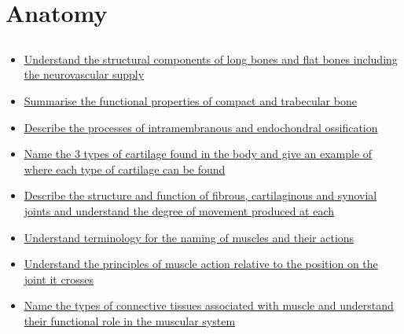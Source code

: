 \documentclass[10pt, a4paper]{article}
\begin{document}
\section{Anatomy}
\subsection{} \begin{itemize} \item \href{https://www.notion.so/2093c89b619848cf8682621738198af8}{Understand the structural components of long bones and flat bones including the neurovascular supply } \item \href{https://www.notion.so/e0f648d9053a4c209b498263d50acf19}{Summarise the functional properties of compact and trabecular bone} \item \href{https://www.notion.so/a5f60b7446204215b8c7420bae6ef034}{Describe the processes of intramembranous and endochondral ossification} \item \href{https://www.notion.so/ab94a8681cf54ed0810dae281dee9735}{Name the 3 types of cartilage found in the body and give an example of where each type of cartilage can be found} \item \href{https://www.notion.so/350df500b4214b198c356a60a27000bb}{Describe the structure and function of fibrous, cartilaginous and synovial joints and understand the degree of movement produced at each} \item \href{https://www.notion.so/05249dcd97e54f9987c168e39ce128ff}{Understand terminology for the naming of muscles and their actions } \item \href{https://www.notion.so/281d585c94af4a00b38638a631c28d59}{Understand the principles of muscle action relative to the position on the joint it crosses } \item \href{https://www.notion.so/61210998b9044007bf4cd37081fca7c3}{Name the types of connective tissues associated with muscle and understand their functional role in the muscular system} \end{itemize}
\end{document}
